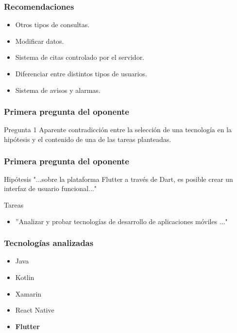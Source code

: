 \documentclass[14pt]{beamer}
\begin{document}
\begin{frame}
\frametitle{Recomendaciones}

\begin{itemize}
\item Otros tipos de consultas.
\item Modificar datos.
\item Sistema de citas controlado por el servidor.
\item Diferenciar entre distintos tipos de usuarios.
\item Sistema de avisos y alarmas.
\end{itemize}

\end{frame}





\begin{frame}
\maketitle
\end{frame}




\begin{frame}
\frametitle{Primera pregunta del oponente}
\begin{block}{Pregunta 1}
Aparente contradicción entre la selección de una tecnología en la hipótesis y el contenido de una de las tareas planteadas.
\end{block}
\end{frame}


\begin{frame}
\frametitle{Primera pregunta del oponente}
\begin{block}{Hipótesis}
"...sobre la plataforma Flutter a través de Dart, es posible crear un interfaz de usuario funcional..."
\end{block}

\begin{alertblock}{Tareas}
\begin{itemize}
\item ''Analizar y probar tecnologías de desarrollo de aplicaciones móviles ..."
\end{itemize}

\end{alertblock}
\end{frame}

\begin{frame}
\frametitle{Tecnologías analizadas}
\begin{itemize}
\item Java
\item Kotlin
\item Xamarin
\item React Native
\item \textbf{Flutter}

\end{itemize}

\end{frame}
\end{document}
